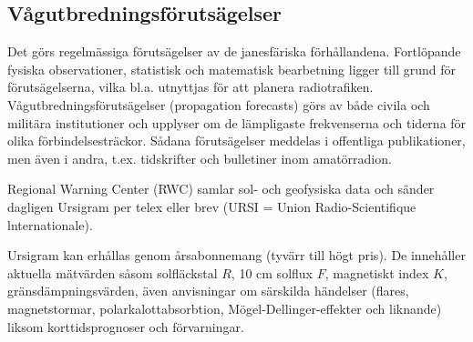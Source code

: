 \subsection{Vågutbredningsförutsägelser}

Det görs regelmässiga förutsägelser av de janesfäriska
förhållandena. Fortlöpande fysiska observationer, statistisk och
matematisk bearbetning ligger till grund för förutsägelserna, vilka
bl.a. utnyttjas för att planera radiotrafiken.
Vågutbredningsförutsägelser (propagation forecasts) görs av både
civila och militära institutioner och upplyser om de lämpligaste
frekvenserna och tiderna för olika förbindelsesträckor. Sådana
förutsägelser meddelas i offentliga publikationer, men även i andra,
t.ex. tidskrifter och bulletiner inom amatörradion.

Regional Warning Center (RWC) samlar sol- och geofysiska data och
sänder dagligen Ursigram per telex eller brev (URSI = Union
Radio-Scientifique lnternationale).

Ursigram kan erhållas genom årsabonnemang (tyvärr till högt pris). De
innehåller aktuella mätvärden såsom solfläckstal \(R\), 10 cm solflux
\(F\), magnetiskt index \(K\), gränsdämpningsvärden, även anvisningar
om särskilda händelser (flares, magnetstormar, polarkalottabsorbtion,
Mögel-Dellinger-effekter och liknande) liksom korttidsprognoser och
förvarningar.

